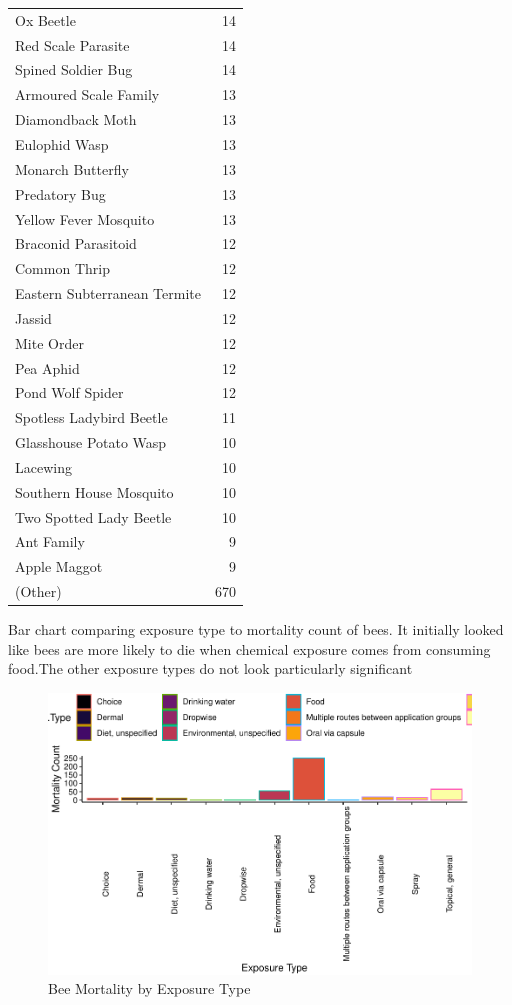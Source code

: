 \documentclass[
  12pt,
]{article}
\begin{document}
\begin{longtable}[]{@{}lr@{}}
Ox Beetle & 14 \\
Red Scale Parasite & 14 \\
Spined Soldier Bug & 14 \\
Armoured Scale Family & 13 \\
Diamondback Moth & 13 \\
Eulophid Wasp & 13 \\
Monarch Butterfly & 13 \\
Predatory Bug & 13 \\
Yellow Fever Mosquito & 13 \\
Braconid Parasitoid & 12 \\
Common Thrip & 12 \\
Eastern Subterranean Termite & 12 \\
Jassid & 12 \\
Mite Order & 12 \\
Pea Aphid & 12 \\
Pond Wolf Spider & 12 \\
Spotless Ladybird Beetle & 11 \\
Glasshouse Potato Wasp & 10 \\
Lacewing & 10 \\
Southern House Mosquito & 10 \\
Two Spotted Lady Beetle & 10 \\
Ant Family & 9 \\
Apple Maggot & 9 \\
(Other) & 670 \\
\bottomrule
\end{longtable}

Bar chart comparing exposure type to mortality count of bees. It
initially looked like bees are more likely to die when chemical exposure
comes from consuming food.The other exposure types do not look
particularly significant

\begin{figure}
\centering
\includegraphics{UpdatedwithModel_files/figure-latex/unnamed-chunk-3-1.pdf}
\caption{Bee Mortality by Exposure Type}
\end{figure}
\end{document}
